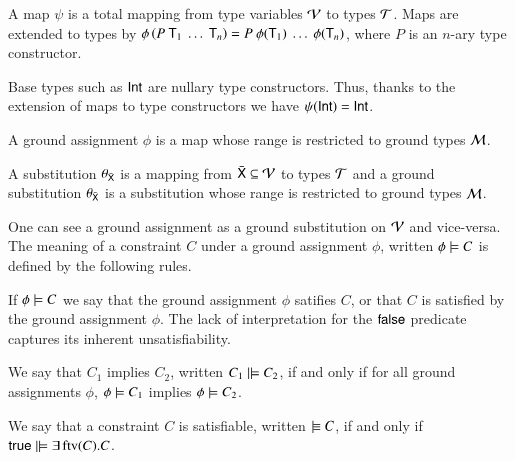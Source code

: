\documentclass{report}
\begin{document}
  \begin{dfn}
    A map $\psi$ is a total mapping from type variables $\mathcal{V}$
    to types $\mathcal{T}$. Maps are extended to types by 
    $\phi\left({P \ \textsf{T}_1 \ \ldots \ \textsf{T}_n}\right) = P \ \phi(\textsf{T}_1) \ \ldots \ \phi(\textsf{T}_n)$,
    where $P$ is an $n$-ary type constructor.
  \end{dfn}
  Base types such as $\textsf{Int}$ are nullary type constructors. Thus,
  thanks to the extension of maps to type constructors we have
  $\psi(\textsf{Int})=\textsf{Int}$.
  \begin{dfn}
    A ground assignment $\phi$ is a map whose range is restricted
    to ground types $\mathcal{M}$.
  \end{dfn}
  \begin{dfn}
    A substitution $\theta_{\bar{\textsf{X}}}$ is a mapping from
    $\bar{\textsf{X}}\subseteq\mathcal{V}$ to types $\mathcal{T}$ and
    a ground substitution $\theta_{\bar{\textsf{X}}}$ is a substitution
    whose range is restricted to ground types $\mathcal{M}$.
  \end{dfn}
  One can see a ground assignment as a ground substitution on $\mathcal{V}$ and vice-versa.
  The meaning of a constraint $C$ under a ground assignment $\phi$, written
  $\phi\models C$ is defined by the following rules.
  If $\phi\models C$ we say that the ground assignment $\phi$ satifies $C$, or
  that $C$ is satisfied by the ground assignment $\phi$.
  The lack of interpretation for the $\textsf{false}$ predicate captures its inherent
  unsatisfiability.
  \begin{dfn}
    We say that $C_1$ implies $C_2$, written $C_1\mathrel|\models C_2$,
    if and only if for all ground assignments $\phi$, $\phi\models C_1$ implies
    $\phi\models C_2$.
  \end{dfn}
  \begin{dfn}
    We say that a constraint $C$ is satisfiable, written $\cissat C$,
    if and only if $\textsf{true}\mathrel|\models\exists\mathop{\rm ftv}\nolimits(C).C$.
  \end{dfn}
\end{document}
